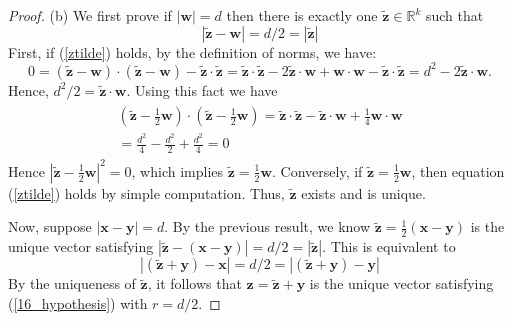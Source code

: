 \documentclass[12pt]{article}
\begin{document}
\begin{proof}
\vspace{5mm}

(b) We first prove if $|\mathbf{w}| = d$ then there is exactly one $\tilde{\mathbf{z}} \in \mathbb{R}^k$ such that
\begin{equation}\label{ztilde}
 |\tilde{\mathbf{z}} - \mathbf{w}| = d/2 = |\tilde{\mathbf{z}}|
 \end{equation}
First, if (\ref{ztilde}) holds, by the definition of norms,  we have:
\begin{equation}
0 = (\tilde{\mathbf{z}} - \mathbf{w})\cdot (\tilde{\mathbf{z}} - \mathbf{w}) - \tilde{\mathbf{z}}\cdot \tilde{\mathbf{z}} = \tilde{\mathbf{z}} \cdot \tilde{\mathbf{z}} - 2\tilde{\mathbf{z}}\cdot \mathbf{w} + \mathbf{w}\cdot\mathbf{w} - \tilde{\mathbf{z}}\cdot \tilde{\mathbf{z}} = d^2 - 2\tilde{\mathbf{z}}\cdot \mathbf{w}.
\end{equation}
Hence, $d^2/2 = \tilde{\mathbf{z}}\cdot \mathbf{w}$.  Using this fact we have
\begin{align}
\begin{split}
\left(\tilde{\mathbf{z}} - \frac{1}{2}\mathbf{w}\right)\cdot \left(\tilde{\mathbf{z}} - \frac{1}{2}\mathbf{w}\right) = \tilde{\mathbf{z}}\cdot\tilde{\mathbf{z}} - \tilde{\mathbf{z}}\cdot\mathbf{w} + \frac{1}{4}\mathbf{w}\cdot\mathbf{w} \\
= \frac{d^2}{4} - \frac{d^2}{2} + \frac{d^2}{4} = 0
\end{split}
\end{align}
Hence $\left| \tilde{\mathbf{z}} - \frac{1}{2}\mathbf{w} \right|^2 = 0$, which implies $\tilde{\mathbf{z}} = \frac{1}{2}\mathbf{w}$.  Conversely, if $\tilde{\mathbf{z}} = \frac{1}{2}\mathbf{w}$, then equation (\ref{ztilde}) holds by simple computation.  Thus, $\tilde{\mathbf{z}}$ exists and is unique.\par

Now, suppose $|\mathbf{x} - \mathbf{y}| = d$.  By the previous result, we know $\tilde{\mathbf{z}} = \frac{1}{2}(\mathbf{x} - \mathbf{y})$ is the unique vector satisfying $|\tilde{\mathbf{z}} - (\mathbf{x} - \mathbf{y})| = d/2 = |\tilde{\mathbf{z}}|$.  This is equivalent to
\begin{equation}
|(\tilde{\mathbf{z}} + \mathbf{y}) - \mathbf{x}| = d/2 = |(\tilde{\mathbf{z}} + \mathbf{y}) - \mathbf{y}|
\end{equation}
By the uniqueness of $\tilde{\mathbf{z}}$, it follows that $\mathbf{z} = \tilde{\mathbf{z}} + \mathbf{y}$ is the unique vector satisfying (\ref{16_hypothesis}) with $r = d/2$.
\end{proof}
\end{document}
